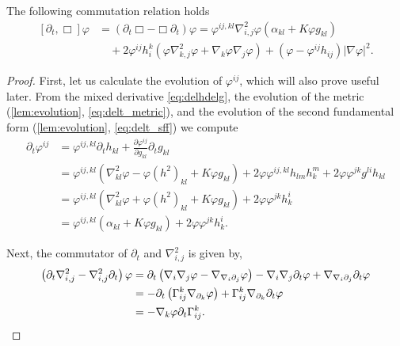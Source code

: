 \documentclass{amsart}
\begin{document}
\begin{lemma}
\label{lem:deltBox}
The following commutation relation holds
\[
\begin{split}
[\partial_t, \Box] \varphi &= (\partial_{t}\Box - \Box\partial_{t}) \varphi = \varphi^{ij,kl} \nabla^2_{i,j} \varphi (\alpha_{kl} + K \varphi g_{kl}) \\
&\quad + 2\varphi^{ij}h^{k}_{i} (\varphi \nabla^2_{k,j} \varphi + \nabla_k \varphi \nabla_j \varphi) + (\varphi - \varphi^{ij}h_{ij})| \nabla\varphi|^{2}.
\end{split}
\]
\end{lemma}

\begin{proof}
First, let us calculate the evolution of \(\varphi^{ij}\), which will also prove useful later. From the mixed derivative \cref{eq:delhdelg}, the evolution of the metric (\cref{lem:evolution}, \cref{eq:delt_metric}), and the evolution of the second fundamental form (\cref{lem:evolution}, \cref{eq:delt_sff}) we compute
\begin{equation}
\label{eq:deltBox}
\begin{split}
\partial_{t} \varphi^{ij} &= \varphi^{ij,kl} \partial_t h_{kl} + \frac{\partial\varphi^{ij}}{\partial g_{kl}} \partial_t g_{kl} \\
&= \varphi^{ij,kl} \left(\nabla^2_{kl} \varphi - \varphi(h^2)_{kl} + K \varphi g_{kl}\right) + 2\varphi \varphi^{ij,kl} h_{lm}h^{m}_{k} + 2\varphi\varphi^{jk}g^{li}h_{kl} \\
&= \varphi^{ij,kl} \left(\nabla^2_{kl} \varphi + \varphi(h^2)_{kl} + K \varphi g_{kl}\right) + 2\varphi\varphi^{jk}h^{i}_{k} \\
&= \varphi^{ij,kl} \left(\alpha_{kl} + K \varphi g_{kl}\right) + 2\varphi\varphi^{jk}h^{i}_{k}.
\end{split}
\end{equation}

Next, the commutator of \(\partial_t\) and \(\nabla^2_{i,j}\) is given by,
\begin{equation}
\label{eq:deltnabla2}
\begin{split}
\left(\partial_{t}\nabla^2_{i,j} - \nabla^2_{i,j}\partial_{t}\right) \varphi &= \partial_t \left(\nabla_i \nabla_j \varphi - \nabla_{\nabla_i \partial_j} \varphi\right) - \nabla_i \nabla_j \partial_t \varphi + \nabla_{\nabla_i \partial_j} \partial_t \varphi \\
&= - \partial_t \left(\Gamma_{ij}^k \nabla_{\partial_k} \varphi\right) + \Gamma_{ij}^k \nabla_{\partial_k} \partial_t \varphi \\
&= - \nabla_k \varphi \partial_t \Gamma_{ij}^k.
\end{split}
\end{equation}


\end{proof}
\end{document}
